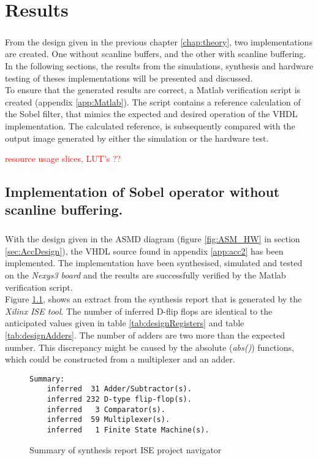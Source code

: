 \chapter{Results}
\label{chap:Results}
\paragraph*{}
From the design given in the previous chapter \ref{chap:theory}, two implementations are created. One without scanline buffers, and the other with scanline buffering. In the following sections, the results from the simulations, synthesis and hardware testing of theses implementations will be presented and discussed. \\
To ensure that the generated results are correct, a Matlab verification script is created (appendix \ref{app:Matlab}). The script contains a reference calculation of the Sobel filter, that mimics the expected and desired operation of the VHDL implementation.
The calculated reference, is subsequently compared with the output image generated by either the simulation or the hardware test.

\textcolor{red}{resource usage slices, LUT's ??}
\section{Implementation of Sobel operator without scanline buffering.}
\paragraph*{}
With the design given in the ASMD diagram (figure \ref{fig:ASM_HW} in section \ref{sec:AccDesign}), the VHDL source found in appendix \ref{app:acc2} has been implemented. The implementation have been synthesised, simulated and tested on the \textit{Nexys3 board} and the results are successfully verified by the Matlab verification script.\\
Figure \ref{fig:sum_synthesis_report}, shows an extract from the synthesis report that is generated by the \textit{Xilinx  ISE tool}. The number of inferred D-flip flops are identical to the anticipated values given in table  \ref{tab:designRegisters} and table \ref{tab:designAdders}. The number of adders are two more than the expected number. This discrepancy might be caused by the absolute (\textit{abs()}) functions, which could be constructed from a multiplexer and an adder. 

\begin{figure}[H]
\centering
\small
\begin{BVerbatim}
Summary:
    inferred  31 Adder/Subtractor(s).
    inferred 232 D-type flip-flop(s).
    inferred   3 Comparator(s).
    inferred  59 Multiplexer(s).
    inferred   1 Finite State Machine(s).
\end{BVerbatim}
\caption{Summary of synthesis report ISE project navigator}
\label{fig:sum_synthesis_report}
\end{figure}


